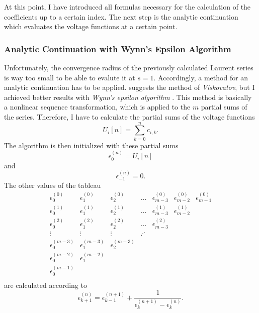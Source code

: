 At this point, I have introduced all formulas necessary for the calculation of the coefficients up to a certain index. The next step is the analytic continuation which evaluates the voltage functions at a certain point.

\subsubsection{Analytic Continuation with Wynn's Epsilon Algorithm}

Unfortunately, the convergence radius of the previously calculated Laurent series is way too small to be able to evalute it at $s = 1$. Accordingly, a method for an analytic continuation has to be applied. \citep{helmPatentSept2009} suggests the method of \emph{Viskovatov}, but I achieved better results with \emph{Wynn's epsilon algorithm} \citep{epsilonWynn}. This method is basically a nonlinear sequence transformation, which is applied to the $m$ partial sums of the series. Therefore, I have to calculate the partial sums of the voltage functions
\begin{equation}
	U_i[n] = \sum_{k = 0}^n c_{i,k}.
\end{equation}
The algorithm is then initialized with these partial sums
\begin{equation}
	\epsilon_0^{(n)} = U_i[n]
\end{equation}
and
\begin{equation}
	\epsilon_{-1}^{(n)} = 0.
\end{equation}
The other values of the tableau
\begin{equation}
	\begin{matrix}
	\epsilon_0^{(0)}	& \epsilon_1^{(0)}		& \epsilon_2^{(0)}		& \hdots 	& \epsilon_{m-3}^{(0)} 	& \epsilon_{m-2}^{(0)} 	& \epsilon_{m-1}^{(0)} \\
	\epsilon_0^{(1)}	& \epsilon_1^{(1)}		& \epsilon_2^{(1)}		& \hdots 	& \epsilon_{m-3}^{(1)} 	& \epsilon_{m-2}^{(1)} \\
	\epsilon_0^{(2)}	& \epsilon_1^{(2)}		& \epsilon_2^{(2)}		& \hdots 	& \epsilon_{m-3}^{(2)} \\
	\vdots				& \vdots				& \vdots				& \iddots \\
	\epsilon_0^{(m-3)}	& \epsilon_1^{(m-3)}	& \epsilon_2^{(m-3)}	& \\
	\epsilon_0^{(m-2)}	& \epsilon_1^{(m-2)} \\
	\epsilon_0^{(m-1)} \\
	\end{matrix}
	\label{eq:epsilon_wynn_tableau}
\end{equation}
are calculated according to
\begin{equation}
	\epsilon_{k + 1}^{(n)} = \epsilon_{k - 1}^{(n + 1)} + \frac{1}{\epsilon_{k}^{(n + 1)} - \epsilon_{k}^{(n)}}.
	\label{eq:epsilon_wynn}
\end{equation}


